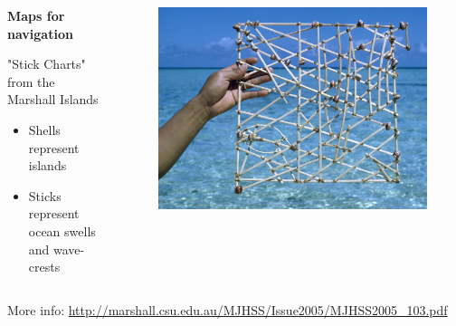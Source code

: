 \documentclass[aspectratio=169]{beamer}
\begin{document}
\begin{frame}
	
	
	\begin{columns}
		
		\begin{column}{0.32\textwidth}
			
			\textbf{Maps for navigation}
			
			\vspace{8mm}
			
			"Stick Charts" from the Marshall Islands
			
			\begin{itemize}
				\item Shells represent islands
				\item Sticks represent ocean swells and wave-crests
			\end{itemize}
			
		\end{column}
		
		\begin{column}{0.68\textwidth}
			\begin{figure}
				\centering
				\includegraphics[width=0.99\linewidth]{images/marshall_stick_chart.jpg}
			\end{figure}
			
		\end{column}
		
	\end{columns}
	
	\vspace{2mm}
	\tiny More info: \url{http://marshall.csu.edu.au/MJHSS/Issue2005/MJHSS2005_103.pdf}
	
\end{frame}
\end{document}
